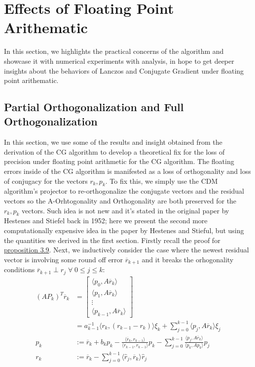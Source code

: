 \documentclass[]{article}
\theoremstyle{definition}
\begin{document}
\section{Effects of Floating Point Arithematic}
    In this section, we highlights the practical concerns of the algorithm and showcase it with numerical experiments with analysis, in hope to get deeper insights about the behaviors of Lanczos and Conjugate Gradient under floating point arithematic. 
    \subsection{Partial Orthogonalization and Full Orthogonalization}
        In this section, we use some of the results and insight obtained from the derivation of the CG algorithm to develop a theoretical fix for the loss of precision under floating point arithmetic for the CG algorithm. The floating errors inside of the CG algorithm is manifested as a loss of orthogonality and loss of conjugacy for the vectors $r_k, p_k$. To fix this, we simply use the CDM algorithm's projector to re-orthogonalize the conjugate vectors and the residual vectors so the A-Orhtogonality and Orthogonality are both preserved for the $r_k, p_k$ vectors. Such idea is not new and it's stated in the original paper by Hestenes and Stiefel back in 1952; here we present the second more computationally expensive idea in the paper by Hestenes and Stieful, but using the quantities we derived in the first section. Firstly recall the proof for \hyperref[prop:CG_Recurrences]{proposition 3.9}. Next, we inductively consider the case where the newest residual vector is involving some round off error $\overline{r}_{k + 1}$ and it breaks the orhogonality conditions $\overline{r}_{k + 1} \perp r_{j} \; \forall \; 0 \le j \le k$: 
        \begin{align}
            (AP_k)^T\overline{r}_k &= 
            \begin{bmatrix}
                \langle p_0, A\overline{r}_k\rangle
                \\
                \langle p_1, A\overline{r}_k\rangle
                \\
                \vdots
                \\
                \langle p_{k - 1}, A\overline{r}_k\rangle
            \end{bmatrix}
            \\
            & = 
            a_{k - 1}^{-1}\langle r_k, (r_{k - 1} - r_k)\rangle\xi_k + \sum_{j = 0}^{k - 1}\langle p_j, A\overline{r}_k\rangle \xi_j
            \\
            p_k &:= \overline{r}_k + b_kp_k - 
                \frac{\langle \overline{r}_k, r_{k -1}\rangle}{\langle r_{k - 1}, r_{k - 1}\rangle}p_k
            - \sum_{j = 0}^{k - 1}\frac{\langle p_j, A\overline{r}_k\rangle}{\langle p_k, Ap_k\rangle}p_j
            \\
            r_k &:= \overline{r}_k - \sum_{j = 0}^{k - 1} \langle \hat{r}_j,\overline{r}_k\rangle \hat{r}_j
        \end{align}
\end{document}
